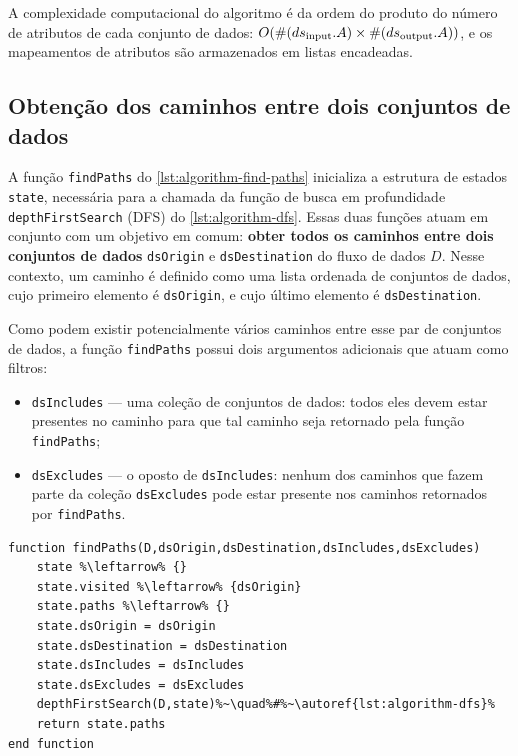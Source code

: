 A complexidade computacional do algoritmo é da ordem do produto do número de atributos de cada conjunto de dados: \(O(\#(ds_{\textup{input}}.A) \times \#(ds_{\textup{output}}.A))\), e os mapeamentos de atributos são armazenados em listas encadeadas.

\subsection{Obtenção dos caminhos entre dois conjuntos de dados}

A função \texttt{findPaths} do \autoref{lst:algorithm-find-paths} inicializa a estrutura de estados \texttt{state}, necessária para a chamada da função de busca em profundidade  \texttt{depthFirstSearch} (DFS) do \autoref{lst:algorithm-dfs}. Essas duas funções atuam em conjunto com um objetivo em comum: \textbf{obter todos os caminhos entre dois conjuntos de dados} \texttt{dsOrigin} e \texttt{dsDestination} do fluxo de dados \(D\).
Nesse contexto, um caminho é definido como uma lista ordenada de conjuntos de dados, cujo primeiro elemento é \texttt{dsOrigin}, e cujo último elemento é \texttt{dsDestination}.

Como podem existir potencialmente vários caminhos entre esse par de conjuntos de dados, a função \texttt{findPaths} possui dois argumentos adicionais que atuam como filtros:

\begin{itemize}
    \item \texttt{dsIncludes} --- uma coleção de conjuntos de dados: todos eles devem estar presentes no caminho para que tal caminho seja retornado pela função \texttt{findPaths};
    \item \texttt{dsExcludes} --- o oposto de \texttt{dsIncludes}: nenhum dos caminhos que fazem parte da coleção \texttt{dsExcludes} pode estar presente nos caminhos retornados por \texttt{findPaths}.
\end{itemize}

\begin{minipage}[c]{0.95\textwidth}
\begin{lstlisting}[language=pseudocode,label={lst:algorithm-find-paths},caption={[Obtenção dos caminhos entre dois conjuntos de dados]Obtenção de todos os caminhos entre dois conjuntos de dados, inicializando a \textsc{DFS} com um estado inicial apropriado.}]
function findPaths(D,dsOrigin,dsDestination,dsIncludes,dsExcludes)
    state %\leftarrow% {}
    state.visited %\leftarrow% {dsOrigin}
    state.paths %\leftarrow% {}
    state.dsOrigin = dsOrigin
    state.dsDestination = dsDestination
    state.dsIncludes = dsIncludes
    state.dsExcludes = dsExcludes
    depthFirstSearch(D,state)%~\quad%#%~\autoref{lst:algorithm-dfs}%
    return state.paths
end function
\end{lstlisting}
\end{minipage}

